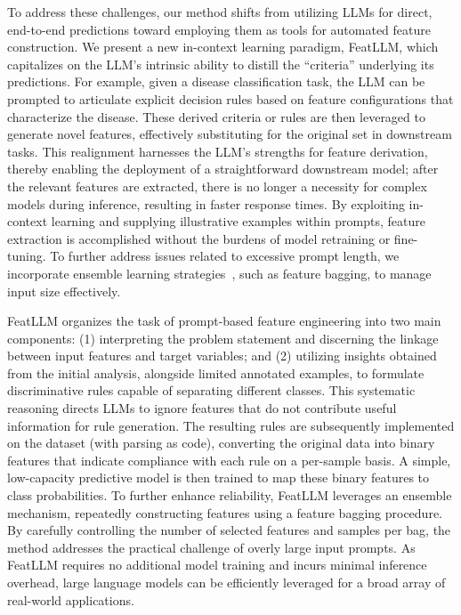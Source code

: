 To address these challenges, our method shifts from utilizing LLMs for direct, end-to-end predictions toward employing them as tools for automated feature construction. We present a new in-context learning paradigm, \textsf{FeatLLM}, which capitalizes on the LLM’s intrinsic ability to distill the “criteria” underlying its predictions. For example, given a disease classification task, the LLM can be prompted to articulate explicit decision rules based on feature configurations that characterize the disease. These derived criteria or rules are then leveraged to generate novel features, effectively substituting for the original set in downstream tasks. This realignment harnesses the LLM’s strengths for feature derivation, thereby enabling the deployment of a straightforward downstream model; after the relevant features are extracted, there is no longer a necessity for complex models during inference, resulting in faster response times. By exploiting in-context learning and supplying illustrative examples within prompts, feature extraction is accomplished without the burdens of model retraining or fine-tuning. To further address issues related to excessive prompt length, we incorporate ensemble learning strategies~\cite{breiman2001random}, such as feature bagging, to manage input size effectively.

\textsf{FeatLLM} organizes the task of prompt-based feature engineering into two main components: (1) interpreting the problem statement and discerning the linkage between input features and target variables; and (2) utilizing insights obtained from the initial analysis, alongside limited annotated examples, to formulate discriminative rules capable of separating different classes. This systematic reasoning directs LLMs to ignore features that do not contribute useful information for rule generation. The resulting rules are subsequently implemented on the dataset (with parsing as code), converting the original data into binary features that indicate compliance with each rule on a per-sample basis. A simple, low-capacity predictive model is then trained to map these binary features to class probabilities. To further enhance reliability, \textsf{FeatLLM} leverages an ensemble mechanism, repeatedly constructing features using a feature bagging procedure. By carefully controlling the number of selected features and samples per bag, the method addresses the practical challenge of overly large input prompts. As \textsf{FeatLLM} requires no additional model training and incurs minimal inference overhead, large language models can be efficiently leveraged for a broad array of real-world applications.

